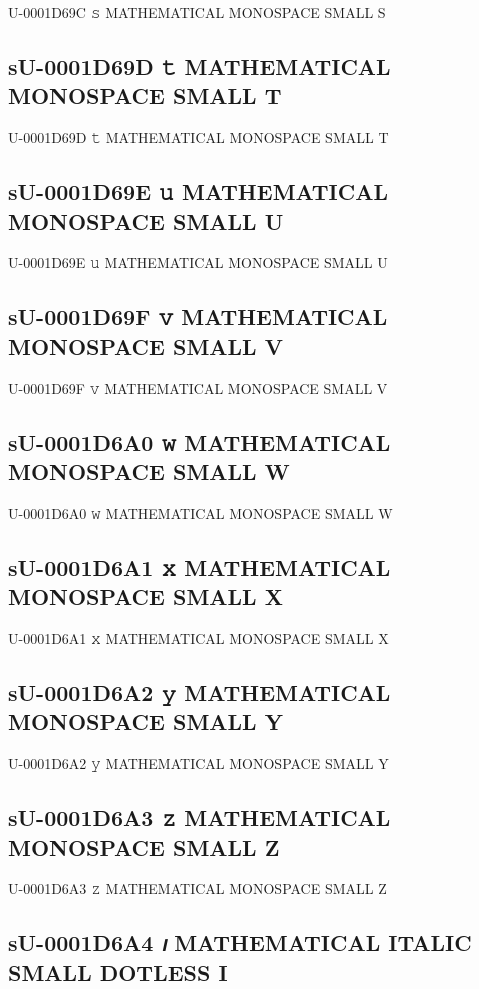 U-0001D69C 𝚜 MATHEMATICAL MONOSPACE SMALL S

\subsection{sU-0001D69D 𝚝 MATHEMATICAL MONOSPACE SMALL T}

U-0001D69D 𝚝 MATHEMATICAL MONOSPACE SMALL T

\subsection{sU-0001D69E 𝚞 MATHEMATICAL MONOSPACE SMALL U}

U-0001D69E 𝚞 MATHEMATICAL MONOSPACE SMALL U

\subsection{sU-0001D69F 𝚟 MATHEMATICAL MONOSPACE SMALL V}

U-0001D69F 𝚟 MATHEMATICAL MONOSPACE SMALL V

\subsection{sU-0001D6A0 𝚠 MATHEMATICAL MONOSPACE SMALL W}

U-0001D6A0 𝚠 MATHEMATICAL MONOSPACE SMALL W

\subsection{sU-0001D6A1 𝚡 MATHEMATICAL MONOSPACE SMALL X}

U-0001D6A1 𝚡 MATHEMATICAL MONOSPACE SMALL X

\subsection{sU-0001D6A2 𝚢 MATHEMATICAL MONOSPACE SMALL Y}

U-0001D6A2 𝚢 MATHEMATICAL MONOSPACE SMALL Y

\subsection{sU-0001D6A3 𝚣 MATHEMATICAL MONOSPACE SMALL Z}

U-0001D6A3 𝚣 MATHEMATICAL MONOSPACE SMALL Z

\subsection{sU-0001D6A4 𝚤 MATHEMATICAL ITALIC SMALL DOTLESS I}

